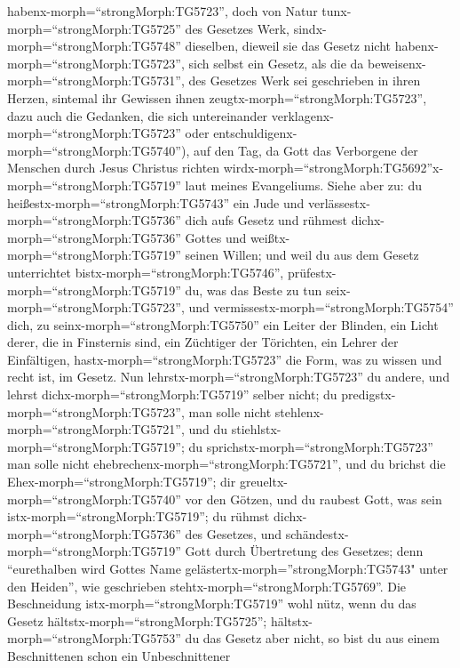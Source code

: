 habenx-morph=``strongMorph:TG5723'', doch von Natur
tunx-morph=``strongMorph:TG5725'' des Gesetzes Werk,
sindx-morph=``strongMorph:TG5748'' dieselben, dieweil sie das Gesetz
nicht habenx-morph=``strongMorph:TG5723'', sich selbst ein Gesetz,
 als die da beweisenx-morph=``strongMorph:TG5731'', des
Gesetzes Werk sei geschrieben in ihren Herzen, sintemal ihr Gewissen
ihnen zeugtx-morph=``strongMorph:TG5723'', dazu auch die Gedanken, die
sich untereinander verklagenx-morph=``strongMorph:TG5723'' oder
entschuldigenx-morph=``strongMorph:TG5740''),  auf den Tag,
da Gott das Verborgene der Menschen durch Jesus Christus richten
wirdx-morph=``strongMorph:TG5692''\textbar x-morph=``strongMorph:TG5719''
laut meines Evangeliums.  Siehe aber zu: du
heißestx-morph=``strongMorph:TG5743'' ein Jude und
verlässestx-morph=``strongMorph:TG5736'' dich aufs Gesetz und rühmest
dichx-morph=``strongMorph:TG5736'' Gottes  und
weißtx-morph=``strongMorph:TG5719'' seinen Willen; und weil du aus dem
Gesetz unterrichtet bistx-morph=``strongMorph:TG5746'',
prüfestx-morph=``strongMorph:TG5719'' du, was das Beste zu tun
seix-morph=``strongMorph:TG5723'',  und
vermissestx-morph=``strongMorph:TG5754'' dich, zu
seinx-morph=``strongMorph:TG5750'' ein Leiter der Blinden, ein Licht
derer, die in Finsternis sind,  ein Züchtiger der
Törichten, ein Lehrer der Einfältigen,
hastx-morph=``strongMorph:TG5723'' die Form, was zu wissen und recht
ist, im Gesetz.  Nun lehrstx-morph=``strongMorph:TG5723''
du andere, und lehrst dichx-morph=``strongMorph:TG5719'' selber nicht;
du predigstx-morph=``strongMorph:TG5723'', man solle nicht
stehlenx-morph=``strongMorph:TG5721'', und du
stiehlstx-morph=``strongMorph:TG5719'';  du
sprichstx-morph=``strongMorph:TG5723'' man solle nicht
ehebrechenx-morph=``strongMorph:TG5721'', und du brichst die
Ehex-morph=``strongMorph:TG5719''; dir
greueltx-morph=``strongMorph:TG5740'' vor den Götzen, und du raubest
Gott, was sein istx-morph=``strongMorph:TG5719'';  du
rühmst dichx-morph=``strongMorph:TG5736'' des Gesetzes, und
schändestx-morph=``strongMorph:TG5719'' Gott durch Übertretung des
Gesetzes;  denn ``eurethalben wird Gottes Name
gelästertx-morph=''strongMorph:TG5743" unter den Heiden'', wie
geschrieben stehtx-morph=``strongMorph:TG5769''.  Die
Beschneidung istx-morph=``strongMorph:TG5719'' wohl nütz, wenn du das
Gesetz hältstx-morph=``strongMorph:TG5725'';
hältstx-morph=``strongMorph:TG5753'' du das Gesetz aber nicht, so bist
du aus einem Beschnittenen schon ein Unbeschnittener

